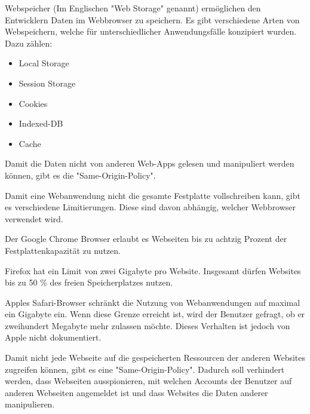 \label{sec:webstorage}


Webspeicher (Im Englischen "Web Storage" genannt) ermöglichen den Entwicklern %
Daten im Webbrowser zu speichern.
Es gibt verschiedene Arten von Webspeichern, welche für unterschiedlicher Anwendungsfälle konzipiert wurden. Dazu zählen:

\begin{itemize}
    \item Local Storage
    \item Session Storage
    \item Cookies
    \item Indexed-DB
    \item Cache
\end{itemize}

Damit die Daten nicht von anderen Web-Apps gelesen und manipuliert werden können, gibt es die "Same-Origin-Policy".


Damit eine Webanwendung nicht die gesamte Festplatte vollschreiben kann, gibt es verschiedene Limitierungen. Diese sind davon abhängig, welcher Webbrowser verwendet wird.

Der Google Chrome Browser erlaubt es Webseiten bis zu achtzig Prozent der Festplattenkapazität zu nutzen.

Firefox hat ein Limit von zwei Gigabyte pro Website. Insgesamt dürfen Websites bis zu 50 \% des freien Speicherplatzes nutzen.

Apples Safari-Browser schränkt die Nutzung von Webanwendungen auf maximal ein Gigabyte ein. Wenn diese Grenze erreicht ist, wird der Benutzer gefragt, ob er zweihundert Megabyte mehr zulassen möchte. Dieses Verhalten ist jedoch von Apple nicht dokumentiert. \cite{WebDevStorage}


Damit nicht jede Webseite auf die gespeicherten Ressourcen der anderen Websites zugreifen können, gibt es eine "Same-Origin-Policy". Dadurch soll verhindert werden, dass Webseiten ausspionieren, mit welchen Accounts der Benutzer auf anderen Webseiten angemeldet ist und dass Websites die Daten anderer manipulieren.


